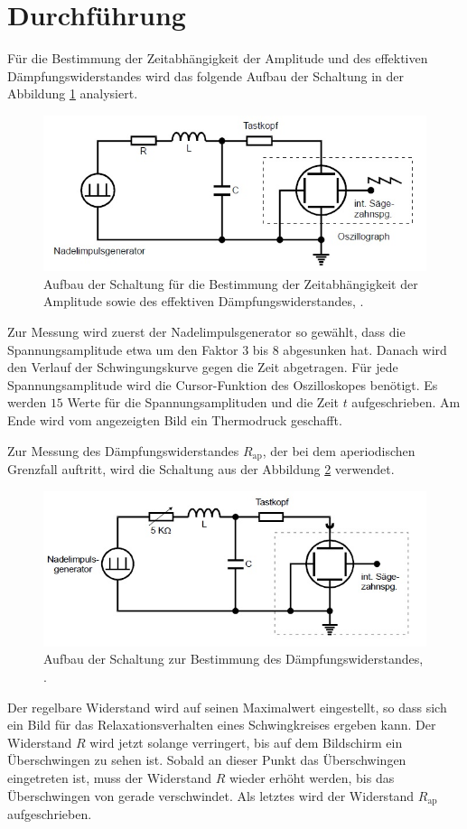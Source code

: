 \section{Durchführung}
\label{sec:Durchführung}
Für die Bestimmung der Zeitabhängigkeit der Amplitude und des effektiven Dämpfungswiderstandes wird das folgende Aufbau der Schaltung in der Abbildung \ref{fig:zeit} analysiert.
\begin{figure}[h!]
	\centering
	\includegraphics[width=0.8\linewidth]{Zeit}
	\caption{Aufbau der Schaltung für die Bestimmung der Zeitabhängigkeit der Amplitude sowie des effektiven Dämpfungswiderstandes, \cite[11]{anleitung354}.}
	\label{fig:zeit}
\end{figure}
Zur Messung wird zuerst der Nadelimpulsgenerator so gewählt, dass die Spannungsamplitude etwa um den Faktor $3$ bis $8$ abgesunken hat. Danach wird den Verlauf der Schwingungskurve gegen die Zeit abgetragen. Für jede Spannungsamplitude wird die Cursor-Funktion des Oszilloskopes benötigt. Es werden $15$  Werte für die Spannungsamplituden und die Zeit $t$ aufgeschrieben. Am Ende wird vom angezeigten Bild ein Thermodruck geschafft.

Zur Messung des Dämpfungswiderstandes $R_{\text{ap}}$, der bei dem aperiodischen Grenzfall auftritt, wird die Schaltung aus der Abbildung \ref{fig:widerstand} verwendet.
\begin{figure}[h!]
	\centering
	\includegraphics[width=0.8\linewidth]{widerstand}
	\caption{Aufbau der Schaltung zur Bestimmung des Dämpfungswiderstandes, \cite[12]{anleitung354}.}
	\label{fig:widerstand}
\end{figure}
Der regelbare Widerstand wird auf seinen Maximalwert eingestellt, so dass sich ein Bild für das Relaxationsverhalten eines Schwingkreises ergeben kann. Der Widerstand $R$ wird jetzt solange verringert, bis auf dem Bildschirm ein Überschwingen zu sehen ist. Sobald an dieser Punkt das Überschwingen eingetreten ist, muss der Widerstand $R$ wieder erhöht werden, bis das Überschwingen von gerade verschwindet. Als letztes wird der Widerstand $R_{\text{ap}}$ aufgeschrieben.

